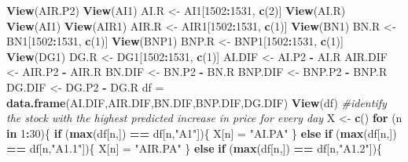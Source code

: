\documentclass[
  11pt,
]{article}
\newenvironment{Shaded}{\begin{snugshade}}{\end{snugshade}}
\newcommand{\CommentTok}[1]{\textcolor[rgb]{0.56,0.35,0.01}{\textit{#1}}}
\newcommand{\ControlFlowTok}[1]{\textcolor[rgb]{0.13,0.29,0.53}{\textbf{#1}}}
\newcommand{\DecValTok}[1]{\textcolor[rgb]{0.00,0.00,0.81}{#1}}
\newcommand{\KeywordTok}[1]{\textcolor[rgb]{0.13,0.29,0.53}{\textbf{#1}}}
\newcommand{\NormalTok}[1]{#1}
\newcommand{\OperatorTok}[1]{\textcolor[rgb]{0.81,0.36,0.00}{\textbf{#1}}}
\newcommand{\StringTok}[1]{\textcolor[rgb]{0.31,0.60,0.02}{#1}}
\begin{document}
\begin{Shaded}
\begin{Highlighting}[]
\KeywordTok{View}\NormalTok{(AIR.P2)}
\KeywordTok{View}\NormalTok{(AI1)}
\NormalTok{AI.R <-}\StringTok{ }\NormalTok{AI1[}\DecValTok{1502}\OperatorTok{:}\DecValTok{1531}\NormalTok{, }\KeywordTok{c}\NormalTok{(}\DecValTok{2}\NormalTok{)]}
\KeywordTok{View}\NormalTok{(AI.R)}
\KeywordTok{View}\NormalTok{(AI1)}
\KeywordTok{View}\NormalTok{(AIR1)}
\NormalTok{AIR.R <-}\StringTok{ }\NormalTok{AIR1[}\DecValTok{1502}\OperatorTok{:}\DecValTok{1531}\NormalTok{, }\KeywordTok{c}\NormalTok{(}\DecValTok{1}\NormalTok{)]}
\KeywordTok{View}\NormalTok{(BN1)}
\NormalTok{BN.R <-}\StringTok{ }\NormalTok{BN1[}\DecValTok{1502}\OperatorTok{:}\DecValTok{1531}\NormalTok{, }\KeywordTok{c}\NormalTok{(}\DecValTok{1}\NormalTok{)]}
\KeywordTok{View}\NormalTok{(BNP1)}
\NormalTok{BNP.R <-}\StringTok{ }\NormalTok{BNP1[}\DecValTok{1502}\OperatorTok{:}\DecValTok{1531}\NormalTok{, }\KeywordTok{c}\NormalTok{(}\DecValTok{1}\NormalTok{)]}
\KeywordTok{View}\NormalTok{(DG1)}
\NormalTok{DG.R <-}\StringTok{ }\NormalTok{DG1[}\DecValTok{1502}\OperatorTok{:}\DecValTok{1531}\NormalTok{, }\KeywordTok{c}\NormalTok{(}\DecValTok{1}\NormalTok{)]}
\NormalTok{AI.DIF <-}\StringTok{ }\NormalTok{AI.P2 }\OperatorTok{-}\StringTok{ }\NormalTok{AI.R}
\NormalTok{AIR.DIF <-}\StringTok{ }\NormalTok{AIR.P2 }\OperatorTok{-}\StringTok{ }\NormalTok{AIR.R}
\NormalTok{BN.DIF <-}\StringTok{ }\NormalTok{BN.P2 }\OperatorTok{-}\StringTok{ }\NormalTok{BN.R}
\NormalTok{BNP.DIF <-}\StringTok{ }\NormalTok{BNP.P2 }\OperatorTok{-}\StringTok{ }\NormalTok{BNP.R}
\NormalTok{DG.DIF <-}\StringTok{ }\NormalTok{DG.P2 }\OperatorTok{-}\StringTok{ }\NormalTok{DG.R}
\NormalTok{df =}\StringTok{ }\KeywordTok{data.frame}\NormalTok{(AI.DIF,AIR.DIF,BN.DIF,BNP.DIF,DG.DIF)}
\KeywordTok{View}\NormalTok{(df)}
\CommentTok{#identify the stock with the highest predicted increase in price for every day}
\NormalTok{X <-}\StringTok{ }\KeywordTok{c}\NormalTok{()}
\ControlFlowTok{for}\NormalTok{ (n }\ControlFlowTok{in} \DecValTok{1}\OperatorTok{:}\DecValTok{30}\NormalTok{)\{}
  \ControlFlowTok{if}\NormalTok{ (}\KeywordTok{max}\NormalTok{(df[n,]) }\OperatorTok{==}\StringTok{ }\NormalTok{df[n,}\StringTok{"A1"}\NormalTok{])\{}
\NormalTok{    X[n] =}\StringTok{ "AI.PA"}
\NormalTok{  \} }\ControlFlowTok{else} \ControlFlowTok{if}\NormalTok{ (}\KeywordTok{max}\NormalTok{(df[n,]) }\OperatorTok{==}\StringTok{ }\NormalTok{df[n,}\StringTok{"A1.1"}\NormalTok{])\{}
\NormalTok{    X[n] =}\StringTok{ "AIR.PA"}
\NormalTok{  \} }\ControlFlowTok{else} \ControlFlowTok{if}\NormalTok{ (}\KeywordTok{max}\NormalTok{(df[n,]) }\OperatorTok{==}\StringTok{ }\NormalTok{df[n,}\StringTok{"A1.2"}\NormalTok{])\{}

\end{Highlighting}
\end{Shaded}
\end{document}
